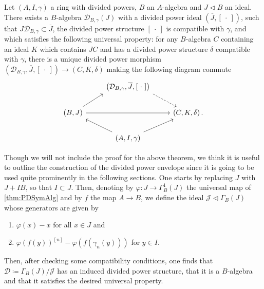 \begin{thm}\label{thm:PDEnvelope}
	Let $\left(A, I, \gamma\right)$ a ring with divided powers, $B$ an $A$-algebra
	and $J \triangleleft B$ an ideal.
	There exists a $B$-algebra $\mathcal{D}_{B,\gamma}(J)$
	with a divided power ideal $\left(\overline{J}, [\ \cdot \ ]\right)$,
	such that $J \mathcal{D}_{B, \gamma} \subset \overline{J}$,
	the divided power structure $[\ \cdot \ ]$ 
	is compatible with $\gamma$, and which satisfies the
	following universal property:
	for any $B$-algebra $C$ containing an ideal
	$K$ which contains $JC$ and has a divided power structure
	$\delta$ compatible  with $\gamma$, there is a unique 
	divided power morphism 
	$\left(\mathcal{D}_{B,\gamma}, \overline{J}, [\ \cdot \ ]\right) \to 
	\left(C, K, \delta\right)$ making the following
	diagram commute
	\begin{equation*}
	\begin{tikzcd}
		&
		\left(\mathcal{D}_{B, \gamma}, \overline{J}, [\ \cdot \ ]\right)
		\arrow[rd, "", dashrightarrow,
		start anchor=south east] & \\
		\left(B, J\right) \arrow[ru, "", rightarrow,
		end anchor=south west] 
		\arrow[rr, "", rightarrow] & &
		\left(C, K, \delta\right). \\
		&
		\left(A, I, \gamma\right)
		\arrow[lu, "", rightarrow,
		start anchor=north west] 
		\arrow[ru, "", rightarrow,
		start anchor=north east] & 
	\end{tikzcd}
	\end{equation*}
\end{thm}


\begin{rem}[]\label{rem:PDEnvelope}
	Though we will not include the proof for the above theorem,
	we think it is useful to outline the construction of the divided power envelope
	since it is going to be used quite prominently in the following sections.
	One starts by replacing $J$ with $J + IB$, so that $I \subset J$.
	Then, denoting by $\varphi\colon J \to \Gamma^1_B(J)$ the universal
	map of \cref{thm:PDSymAlg} and by $f$ the map $A \to B$, 
	we define the ideal $\mathcal{J} \triangleleft \Gamma_B(J)$
	whose generators are given by
\begin{enumerate}
	\item $\varphi(x) - x$ for all $x \in J$ and
	\item $\varphi(f(y))^{[n]} - \varphi(f(\gamma_n(y)))$ for $y \in I$.
\end{enumerate}
	Then, after checking some compatibility conditions, one finds that
	$\mathcal{D} \coloneqq \Gamma_B(J)/\mathcal{J}$ has an induced divided power
	structure, that it is a $B$-algebra and that it satisfies the desired universal property.
\end{rem}


